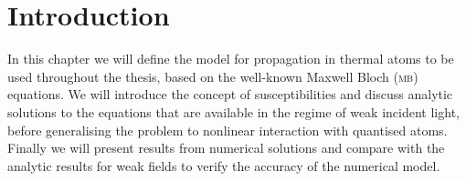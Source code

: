 \section{Introduction}
  \label{sec:propagation_intro}

    In this chapter we will define the model for propagation in thermal atoms to
    be used throughout the thesis, based on the well-known Maxwell Bloch
    (\textsc{mb}) equations. We will introduce the concept of susceptibilities
    and discuss analytic solutions to the equations that are available in the
    regime of weak incident light, before generalising the problem to nonlinear
    interaction with quantised atoms. Finally we will present results from
    numerical solutions and compare with the analytic results for weak fields to
    verify the accuracy of the numerical model.
